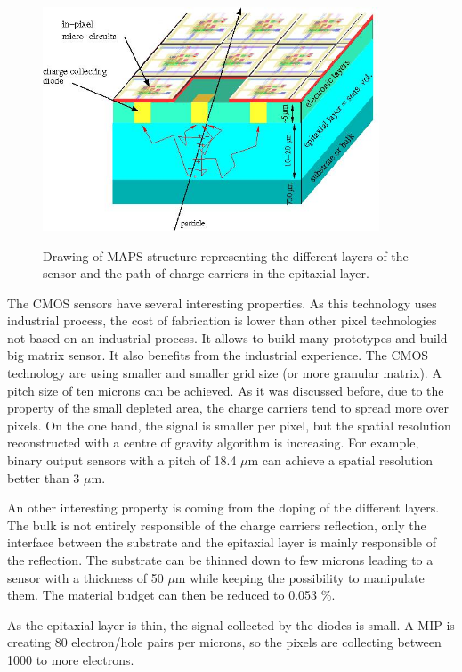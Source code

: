     \begin{figure}[!h]
      \centering
      \includegraphics[width = 10cm]{Pictures/vxd/principeMapsMIP.jpg}
      \label{fig:principleMaps}
      \caption{Drawing of MAPS structure representing the different layers of the sensor and the path of charge carriers in the epitaxial layer.}
    \end{figure}

    The \gls{CMOS} sensors have several interesting properties.
    As this technology uses industrial process, the cost of fabrication is lower than other pixel technologies not based on an industrial process. 
    It allows to build many prototypes and build big matrix sensor.
    It also benefits from the industrial experience. 
    The CMOS technology are using smaller and smaller grid size (or more granular matrix).
    A pitch size of ten microns can be achieved. 
    As it was discussed before, due to the property of the small depleted area, the charge carriers tend to spread more over pixels.
    On the one hand, the signal is smaller per pixel, but the spatial resolution reconstructed with a centre of gravity algorithm is increasing.
    For example, binary output sensors with a pitch of 18.4 $\mu\text{m}$ can achieve a spatial resolution better than 3 $\mu\text{m}$.

    An other interesting property is coming from the doping of the different layers. 
    The bulk is not entirely responsible of the charge carriers reflection, only the interface between the substrate and the epitaxial layer is mainly responsible of the reflection.
    The substrate can be thinned down to few microns leading to a sensor with a thickness of 50 $\mu\text{m}$ while keeping the possibility to manipulate them.
    The material budget can then be reduced to 0.053 \%.

    As the epitaxial layer is thin, the signal collected by the diodes is small.
    A \gls{MIP} is creating 80 electron/hole pairs per microns, so the pixels are collecting between 1000 to more electrons.

